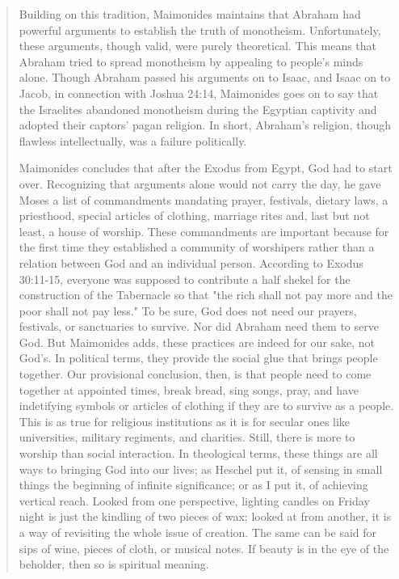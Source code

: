 \documentclass[11pt]{article}
\begin{document}
\begin{quote}
Building on this tradition, Maimonides maintains that Abraham had powerful arguments to establish the truth of monotheism. Unfortunately, these arguments, though valid, were purely theoretical. This means that Abraham tried to spread monotheism by appealing to people's minds alone. Though Abraham passed his arguments on to Isaac, and Isaac on to Jacob, in connection with Joshua 24:14, Maimonides goes on to say that the Israelites abandoned monotheism during the Egyptian captivity and adopted their captors' pagan religion. In short, Abraham's religion, though flawless intellectually, was a failure politically. 

Maimonides concludes that after the Exodus from Egypt, God had to start over. Recognizing that arguments alone would not carry the day, he gave Moses a list of commandments mandating prayer, festivals, dietary laws, a priesthood, special articles of clothing, marriage rites and, last but not least, a house of worship. These commandments are important because for the first time they established a community of worshipers rather than a relation between God and an individual person. According to Exodus 30:11-15, everyone was supposed to contribute a half shekel for the construction of the Tabernacle so that "the rich shall not pay more and the poor shall not pay less." To be sure, God does not need our prayers, festivals, or sanctuaries to survive. Nor did Abraham need them to serve God. But Maimonides adds, these practices are indeed for our sake, not God's. In political terms, they provide the social glue that brings people together. Our provisional conclusion, then, is that people need to come together at appointed times, break bread, sing songs, pray, and have indetifying symbols or articles of clothing if they are to survive as a people. This is as true for religious institutions as it is for secular ones like universities, military regiments, and charities.
Still, there is more to worship than social interaction. In theological terms, these things are all ways to bringing God into our lives; as Heschel put it, of sensing in small things the beginning of infinite significance; or as I put it, of achieving vertical reach. Looked  from one perspective, lighting candles on Friday night is just the kindling of two pieces of wax; looked at from another, it is a way of revisiting the whole issue of creation. The same can be said for sips of wine, pieces of cloth, or musical notes. If beauty is in the eye of the beholder, then so is spiritual meaning. 
\end{quote}
\end{document}

